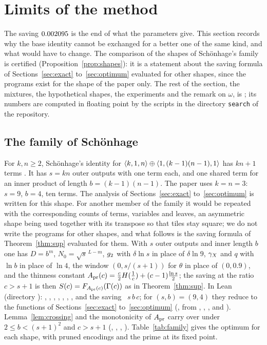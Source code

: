\section{Limits of the method}
\label{sec:limits}

The saving \(0.002095\) is the end of what the parameters give.  This section
records why the base identity cannot be exchanged for a better one of the same
kind, and what would have to change.  The comparison of the shapes of
Sch\"onhage's family is certified (Proposition~\ref{prop:shapes}): it is a
statement about the saving formula of Sections~\ref{sec:exact}
to~\ref{sec:optimum} evaluated for other shapes, since the programs exist for
the shape of the paper only.  The rest of the section, the mixtures, the
hypothetical shapes, the experiments and the remark on \(\omega\), is \nf; its
numbers are computed in floating point by the scripts in the directory
\texttt{search} of the repository.

\subsection{The family of Sch\"onhage}

For \(k,n\ge2\), Sch\"onhage's identity for
\(\langle k,1,n\rangle\oplus\langle 1,(k-1)(n-1),1\rangle\) has \(kn+1\) terms \cite{Sch81}.  It
has \(s=kn\) outer outputs with one term each, and one shared term for an
inner product of length \(b=(k-1)(n-1)\).  The paper uses \(k=n=3\): \(s=9\),
\(b=4\), ten terms.  The analysis of Sections~\ref{sec:exact}
to~\ref{sec:optimum} is written for this shape.  For another member of the
family it would be repeated with the corresponding counts of terms, variables
and leaves, an asymmetric shape being used together with its transpose so that
tiles stay square; we do not write the programs for other shapes, and what
follows is the saving formula of Theorem~\ref{thm:sup} evaluated for them.
With \(s\) outer outputs and inner length \(b\) one has \(D=b^{m}\),
\(N_0=\sqrt s^{\,L-m}\),
\(g_{2}\) with \(\delta\ln s\) in place of \(\delta\ln 9\), \(\gamma_{X}\) and \(q\)
with \(\ln b\) in place of \(\ln 4\), the window \((0,s/(s+1))\) for \(\theta\)
in place of \((0,0.9)\), and the thinness constant
\(A_{\mathrm{pr}}(c)=\frac c2H(\frac1c)+(c-1)\frac{\ln s}2\); the saving at the ratio
\(c>s+1\) is then \(S(c)=F_{A_{\mathrm{pr}}(c)}(\Gamma(c))\) as in Theorem~\ref{thm:sup}.
In Lean (directory ): , ,
, , , , ,
 and the saving ~\(s\,b\,c\); for
\((s,b)=(9,4)\) they reduce to the functions of Sections~\ref{sec:exact}
to~\ref{sec:optimum} (, from ,
, ,  and
).  Lemma~\ref{lem:crossing} and the monotonicity of
\(A_{\mathrm{pr}}\) carry over under \(2\le b<(s+1)^{2}\) and \(c>s+1\)
(, , ,
).  Table~\ref{tab:family} gives the optimum for
each shape, with pruned encodings and the prime at its fixed point.

